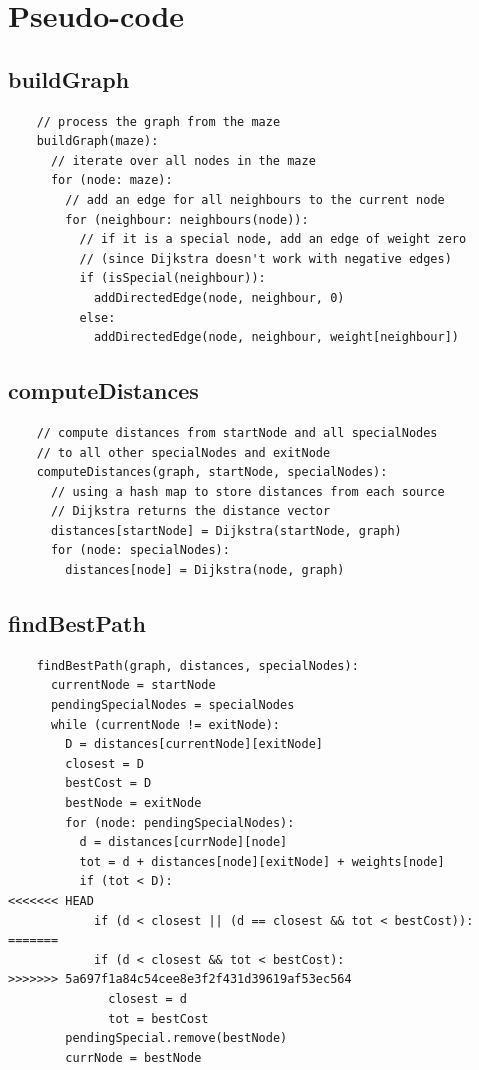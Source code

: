 \documentclass[12pt]{report}
\begin{document}
\section{Pseudo-code}
\subsection{buildGraph}
\begin{tcolorbox}
\begin{verbatim}
    // process the graph from the maze
    buildGraph(maze):
      // iterate over all nodes in the maze
      for (node: maze):
        // add an edge for all neighbours to the current node
        for (neighbour: neighbours(node)):
          // if it is a special node, add an edge of weight zero
          // (since Dijkstra doesn't work with negative edges)
          if (isSpecial(neighbour)):
            addDirectedEdge(node, neighbour, 0)
          else:
            addDirectedEdge(node, neighbour, weight[neighbour])
\end{verbatim}
\end{tcolorbox}

\subsection{computeDistances}
\begin{tcolorbox}
\begin{verbatim}
    // compute distances from startNode and all specialNodes
    // to all other specialNodes and exitNode
    computeDistances(graph, startNode, specialNodes):
      // using a hash map to store distances from each source
      // Dijkstra returns the distance vector
      distances[startNode] = Dijkstra(startNode, graph)
      for (node: specialNodes):
        distances[node] = Dijkstra(node, graph)
\end{verbatim}
\end{tcolorbox}

\subsection{findBestPath}
\begin{tcolorbox}
\begin{verbatim}
    findBestPath(graph, distances, specialNodes):
      currentNode = startNode
      pendingSpecialNodes = specialNodes
      while (currentNode != exitNode):
        D = distances[currentNode][exitNode]
        closest = D
        bestCost = D
        bestNode = exitNode
        for (node: pendingSpecialNodes):
          d = distances[currNode][node]
          tot = d + distances[node][exitNode] + weights[node]
          if (tot < D):
<<<<<<< HEAD
            if (d < closest || (d == closest && tot < bestCost)):
=======
            if (d < closest && tot < bestCost):
>>>>>>> 5a697f1a84c54cee8e3f2f431d39619af53ec564
              closest = d
              tot = bestCost
        pendingSpecial.remove(bestNode)
        currNode = bestNode
\end{verbatim}
\end{tcolorbox}
\end{document}
